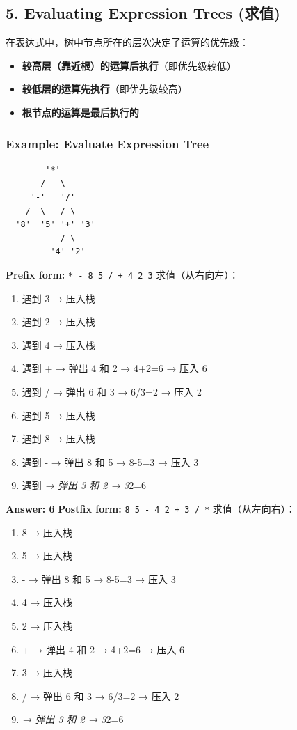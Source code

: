 \documentclass[10pt,a4paper,openany]{ctexbook}
\theoremstyle{definition}
\theoremstyle{remark}
\begin{document}
\vspace{-2pt}

\subsection{5. Evaluating Expression Trees (求值)}

在表达式中，树中节点所在的层次决定了运算的优先级：
\begin{itemize}
\item \textbf{较高层（靠近根）的运算后执行}（即优先级较低）
\item \textbf{较低层的运算先执行}（即优先级较高）
\item \textbf{根节点的运算是最后执行的}

\end{itemize}

\subsubsection{Example: Evaluate Expression Tree}

{\footnotesize\begin{verbatim}
        '*'
       /   \
     '-'   '/'
    /  \   / \
  '8'  '5' '+' '3'
           / \
         '4' '2'
\end{verbatim}}

\textbf{Prefix form:} \texttt{* - 8 5 / + 4 2 3}
求值（从右向左）：
\begin{enumerate}
\item 遇到 3 → 压入栈
\item 遇到 2 → 压入栈
\item 遇到 4 → 压入栈
\item 遇到 + → 弹出 4 和 2 → 4+2=6 → 压入 6
\item 遇到 / → 弹出 6 和 3 → 6/3=2 → 压入 2
\item 遇到 5 → 压入栈
\item 遇到 8 → 压入栈
\item 遇到 - → 弹出 8 和 5 → 8-5=3 → 压入 3
\item 遇到 \textit{ → 弹出 3 和 2 → 3}2=6

\end{enumerate}

\textbf{Answer: 6}
\textbf{Postfix form:} \texttt{8 5 - 4 2 + 3 / *}
求值（从左向右）：
\begin{enumerate}
\item 8 → 压入栈
\item 5 → 压入栈
\item - → 弹出 8 和 5 → 8-5=3 → 压入 3
\item 4 → 压入栈
\item 2 → 压入栈
\item + → 弹出 4 和 2 → 4+2=6 → 压入 6
\item 3 → 压入栈
\item / → 弹出 6 和 3 → 6/3=2 → 压入 2
\item \textit{ → 弹出 3 和 2 → 3}2=6

\end{enumerate}
\end{document}
